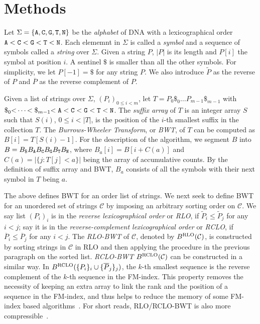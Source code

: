 \documentclass{bioinfo}
\begin{document}
\section{Methods}
\begin{methods}
Let $\Sigma=\{{\tt A},{\tt C},{\tt G},{\tt T},{\tt N}\}$ be the \emph{alphabet}
of DNA with a lexicographical order
${\tt A\char60C\char60G\char60T\char60N}$. Each elememnt in $\Sigma$ is
called a \emph{symbol} and a sequence of symbols called a \emph{string} over
$\Sigma$. Given a string $P$, $|P|$ is its length and $P[i]$ the symbol at
position $i$. A sentinel $\$$ is smaller
than all the other symbols. For simplicity, we let $P[-1]=\$$ for any string
$P$. We also introduce $\widetilde{P}$ as the reverse of $P$ and
$\overline{P}$ as the reverse complement of $P$.

Given a list of strings over $\Sigma$, $(P_i)_{0\le i<m}$, let
$T=P_0\$_0\ldots P_{m-1}\$_{m-1}$ with
${\tt\char36}_0{\tt\char60}\cdots{\char60\tt\char36}_{m-1}{\tt\char60A\char60C\char60G\char60T\char60N}$.
The \emph{suffix array} of $T$ is an integer array $S$ such that $S(i)$,
\mbox{$0\le i<|T|$}, is the position of the $i$-th smallest suffix in the
collection $T$.  The \emph{Burrows-Wheeler Transform}, or \emph{BWT}, of $T$
can be computed as \mbox{$B[i]=T[S(i)-1]$}. For the description of the
algorithm, we segment $B$ into \mbox{$B=B_{\tt\$}B_{\tt A}B_{\tt C}B_{\tt
G}B_{\tt T}B_{\tt N}$}, where \mbox{$B_a[i]=B[i+C(a)]$} and
\mbox{$C(a)=|\{j:T[j]<a\}|$} being the array of accumulative counts. By the
definition of suffix array and BWT, $B_a$ consists of all the symbols with
their next symbol in $T$ being $a$.

The above defines BWT for an order list of strings. We next seek to define BWT
for an unordered set of strings $\mathcal{C}$ by imposing an arbitrary sorting
order on $\mathcal{C}$.  We say list $(P_i)_i$ is in the \emph{reverse
lexicographical order} or \emph{RLO}, if $\widetilde{P}_i\le\widetilde{P}_j$
for any $i<j$; say it is in the \emph{reverse-complement lexicographical order}
or \emph{RCLO}, if $\overline{P}_i\le\overline{P}_j$ for any $i<j$.
The \emph{RLO-BWT} of $\mathcal{C}$, denoted by $B^{\rm RLO}(\mathcal{C})$,
is constructed by sorting strings in $\mathcal{C}$ in RLO and then applying
the procedure in the previous paragraph on the sorted list. \emph{RCLO-BWT}
$B^{\rm RCLO}(\mathcal{C})$ can be constructed in a similar way. In
$B^{\rm RCLO}(\{P_i\}_i\cup\{\overline{P}_j\}_j)$, the $k$-th smallest
sequence is the reverse complement of the $k$-th sequence in the FM-index. This
property removes the necessity of keeping an extra array to link the rank and
the position of a sequence in the FM-index, and thus helps to reduce the memory
of some FM-index based algorithms~\citep{Simpson:2012aa}. For short reads, RLO/RCLO-BWT
is also more compressible~\citep{Cox:2012ly}.


\end{methods}
\end{document}
